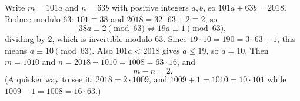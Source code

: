 Write $m=101a$ and $n=63b$ with positive integers $a,b$, so $101a+63b=2018$. Reduce modulo $63$: $101\equiv38$ and $2018=32\cdot63+2\equiv2$, so
\[38a\equiv2\pmod{63}\iff19a\equiv1\pmod{63},\]
dividing by $2$, which is invertible modulo $63$. Since $19\cdot10=190=3\cdot63+1$, this means $a\equiv10\pmod{63}$. Also $101a<2018$ gives $a\le19$, so $a=10$. Then $m=1010$ and $n=2018-1010=1008=63\cdot16$, and
\[m-n=\boxed{2}.\]
(A quicker way to see it: $2018=2\cdot1009$, and $1009+1=1010=10\cdot101$ while $1009-1=1008=16\cdot63$.)
